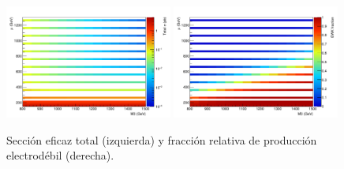\begin{figure}[!h]
  \centering
  \includegraphics[width=0.49\textwidth]{figures/SigXsec_total}
  \includegraphics[width=0.49\textwidth]{figures/SigXsec_ewkFrac}
  \caption{Sección eficaz total (izquierda) y fracción relativa
    de producción electrodébil (derecha).}
  \label{fig:signal_xs_total}
\end{figure}

